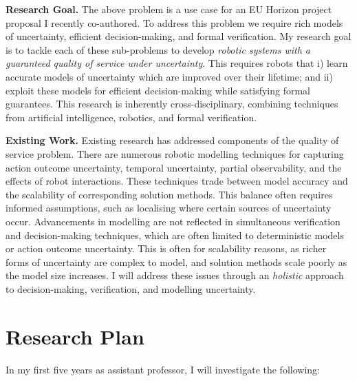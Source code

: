 \documentclass[12pt]{article}
\begin{document}
%
%
%


\vspace*{1ex}\noindent\textbf{Research Goal.} The above problem is a use case for an EU Horizon project proposal I recently co-authored.
%
To address this problem we require rich models of uncertainty, efficient decision-making, and formal verification.
%
My research goal is to tackle each of these sub-problems to develop \emph{robotic systems with a guaranteed quality of service under uncertainty}.
%
This requires robots that i) learn accurate models of uncertainty which are improved over their lifetime; and ii) exploit these models for efficient decision-making while satisfying formal guarantees.
%
This research is inherently cross-disciplinary, combining techniques from artificial intelligence, robotics, and formal verification.

\vspace*{1ex}\noindent\textbf{Existing Work.} Existing research has addressed components of the quality of service problem.
%
There are numerous robotic modelling techniques for capturing action outcome uncertainty, temporal uncertainty, partial observability, and the effects of robot interactions.
%
These techniques trade between model accuracy and the scalability of corresponding solution methods.
%
This balance often requires informed assumptions, such as localising where certain sources of uncertainty occur.
%
Advancements in modelling are not reflected in simultaneous verification and decision-making techniques, which are often limited to deterministic models or action outcome uncertainty.
%
This is often for scalability reasons, as richer forms of uncertainty are complex to model, and solution methods scale poorly as the model size increases.
%
I will address these issues through an \emph{holistic} approach to decision-making, verification, and modelling uncertainty.

\section*{Research Plan}

In my first five years as assistant professor, I will investigate the following:
\end{document}
